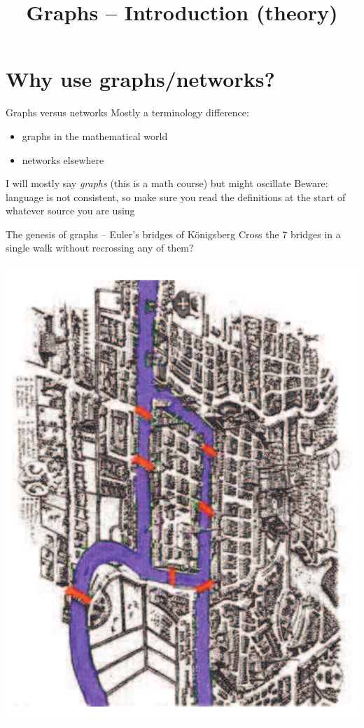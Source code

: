 \documentclass[aspectratio=43]{beamer}
\title{Graphs -- Introduction (theory)}
\date{}
\begin{document}
\begin{frame}
	\titlepage
\end{frame}



\section{Why use graphs/networks?}
\begin{frame}{Graphs versus networks}
	Mostly a terminology difference:
	\begin{itemize}
	\item graphs in the mathematical world
	\item networks elsewhere
	\end{itemize}
	\vfill
	I will mostly say \emph{graphs} (this is a math course) but might oscillate
	\vfill
	Beware: language is not consistent, so make sure you read the definitions at the start of whatever source you are using
\end{frame}

\begin{frame}{The genesis of graphs -- Euler's bridges of K\"onigsberg}
	Cross the 7 bridges in a single walk without recrossing any of them?
	\begin{center}
	\includegraphics[angle=90,width=.9\textwidth]{FIGS_slides/bridge_color}
	\end{center}
\end{frame}
\end{document}
